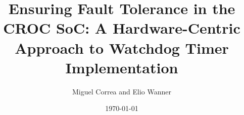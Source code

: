 \documentclass[%
 oneside,      %
 openany,      %
 halfparskip,  %
]{scrbook}
\title{Ensuring Fault Tolerance in the CROC SoC: A Hardware-Centric Approach to Watchdog Timer Implementation}
\author{Miguel Correa and Elio Wanner}
\date{\today}
\begin{document}
\dominitoc

\frontmatter





\tableofcontents



\mainmatter






%



\appendix

\backmatter



\nocite*{} %
% 
% 
\end{document}
